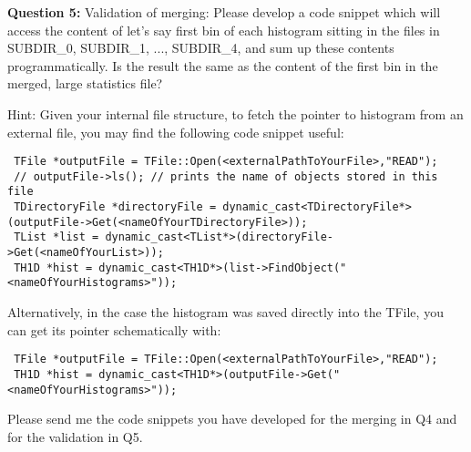 \documentclass[11pt]{article}
\begin{document}
\noindent\textbf{Question 5:} Validation of merging: Please develop a code snippet which will access the content of let's say first bin of each histogram sitting in the files in SUBDIR\_0,  SUBDIR\_1, ...,  SUBDIR\_4, and sum up these contents programmatically. Is the result the same as the content of the first bin in the merged, large statistics file?

\vspace{0.1044cm}

\noindent Hint: Given your internal file structure, to fetch the pointer to histogram from an external file, you may find the following code snippet useful:
%
{\footnotesize
\begin{verbatim}
 TFile *outputFile = TFile::Open(<externalPathToYourFile>,"READ");
 // outputFile->ls(); // prints the name of objects stored in this file
 TDirectoryFile *directoryFile = dynamic_cast<TDirectoryFile*>(outputFile->Get(<nameOfYourTDirectoryFile>));
 TList *list = dynamic_cast<TList*>(directoryFile->Get(<nameOfYourList>));
 TH1D *hist = dynamic_cast<TH1D*>(list->FindObject("<nameOfYourHistograms>"));
\end{verbatim}}

\noindent Alternatively, in the case the histogram was saved directly into the TFile, you can get its pointer schematically with:
%
{\footnotesize
\begin{verbatim}
 TFile *outputFile = TFile::Open(<externalPathToYourFile>,"READ");
 TH1D *hist = dynamic_cast<TH1D*>(outputFile->Get("<nameOfYourHistograms>"));
\end{verbatim}}


\noindent Please send me the code snippets you have developed for the merging in Q4 and for the validation in Q5. 
\end{document}
